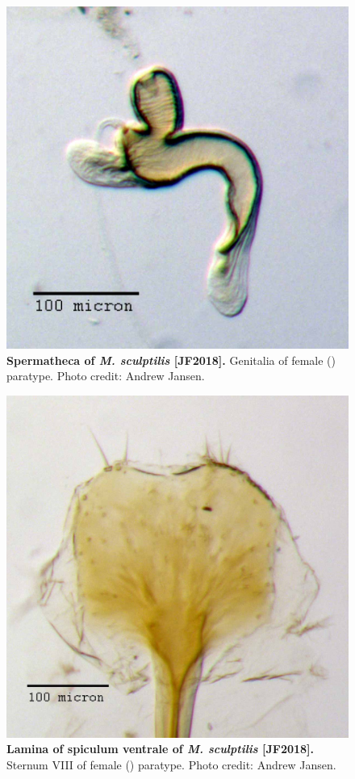 \documentclass[fleqn,10pt,lineno]{wlpeerj} %
\begin{document}
\begin{figure}[h]
	\centering
	\includegraphics[width=\textwidth]{figure27.jpg}
	\caption{\textbf{Spermatheca of \textit{M. sculptilis} [JF2018].} Genitalia of female (\female) paratype. Photo credit: Andrew Jansen.}
	\label{fig:sculptilis_spermatheca}
\end{figure}

\begin{figure}[h]
	\centering
	\includegraphics[width=\textwidth]{figure28.jpg}
	\caption{\textbf{Lamina of spiculum ventrale of \textit{M. sculptilis} [JF2018].} Sternum VIII of female (\female) paratype. Photo credit: Andrew Jansen.}
	\label{fig:sculptilis_lamina}
\end{figure}
\end{document}
